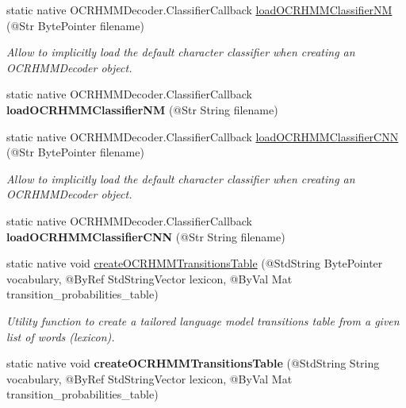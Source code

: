 \begin{DoxyCompactItemize}
\item 
static native O\+C\+R\+H\+M\+M\+Decoder.\+Classifier\+Callback \hyperlink{group__text__recognize_gabe00747d37f40a190b2970f14cdc4d60}{load\+O\+C\+R\+H\+M\+M\+Classifier\+NM} (@Str Byte\+Pointer filename)
\begin{DoxyCompactList}\small\item\em Allow to implicitly load the default character classifier when creating an O\+C\+R\+H\+M\+M\+Decoder object. \end{DoxyCompactList}\item 
static native O\+C\+R\+H\+M\+M\+Decoder.\+Classifier\+Callback {\bfseries load\+O\+C\+R\+H\+M\+M\+Classifier\+NM} (@Str String filename)
\item 
static native O\+C\+R\+H\+M\+M\+Decoder.\+Classifier\+Callback \hyperlink{group__text__recognize_ga03f0450934c0f48a89daa868f8ca9fcf}{load\+O\+C\+R\+H\+M\+M\+Classifier\+C\+NN} (@Str Byte\+Pointer filename)
\begin{DoxyCompactList}\small\item\em Allow to implicitly load the default character classifier when creating an O\+C\+R\+H\+M\+M\+Decoder object. \end{DoxyCompactList}\item 
static native O\+C\+R\+H\+M\+M\+Decoder.\+Classifier\+Callback {\bfseries load\+O\+C\+R\+H\+M\+M\+Classifier\+C\+NN} (@Str String filename)
\item 
static native void \hyperlink{classorg_1_1bytedeco_1_1javacpp_1_1opencv__text_ac23647f4572aeec4389d900bf01bf013}{create\+O\+C\+R\+H\+M\+M\+Transitions\+Table} (@Std\+String Byte\+Pointer vocabulary, @By\+Ref Std\+String\+Vector lexicon, @By\+Val Mat transition\+\_\+probabilities\+\_\+table)
\begin{DoxyCompactList}\small\item\em Utility function to create a tailored language model transitions table from a given list of words (lexicon). \end{DoxyCompactList}\item 
\mbox{\label{classorg_1_1bytedeco_1_1javacpp_1_1opencv__text_aab24701d08ab8131f1f541388c56bdec}} 
static native void {\bfseries create\+O\+C\+R\+H\+M\+M\+Transitions\+Table} (@Std\+String String vocabulary, @By\+Ref Std\+String\+Vector lexicon, @By\+Val Mat transition\+\_\+probabilities\+\_\+table)
\item 
\mbox{\label{classorg_1_1bytedeco_1_1javacpp_1_1opencv__text_abb5e6bd26a8a25684e3aef2c36433315}} 

\end{DoxyCompactItemize}
